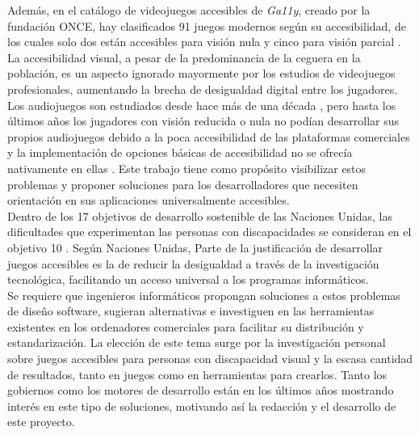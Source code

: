 Además, en el catálogo de videojuegos accesibles de \textit{Ga11y}, creado por la fundación ONCE, hay clasificados 91 juegos modernos según su accesibilidad, de los cuales solo dos están accesibles para visión nula y cinco para visión parcial \cite{Ga11y2022}. La accesibilidad visual, a pesar de la predominancia de la ceguera en la población, es un aspecto ignorado mayormente por los estudios de videojuegos profesionales, aumentando la brecha de desigualdad digital entre los jugadores.\\

Los audiojuegos son estudiados desde hace más de una década \cite{nesteriukAudiogamesAccessibilityInclusion2018a}, pero hasta los últimos años los jugadores con visión reducida o nula no podían desarrollar sus propios audiojuegos debido a la poca accesibilidad de las plataformas comerciales \cite[p.~8]{andradePlayingBlindRevealing2019} y la implementación de opciones básicas de accesibilidad no se ofrecía nativamente en ellas \cite{stana_native_2025, engine_dev_nodate}. Este trabajo tiene como propósito visibilizar estos problemas y proponer soluciones para los desarrolladores que necesiten orientación en sus aplicaciones universalmente accesibles. \\

Dentro de los 17 objetivos de desarrollo sostenible de las Naciones Unidas, las dificultades que experimentan las personas con discapacidades se consideran en el objetivo 10  \cite{martinGoal10Reduce}. Según Naciones Unidas,  Parte de la justificación de desarrollar juegos accesibles es la de reducir la desigualdad a través de la investigación tecnológica, facilitando un acceso universal a los programas informáticos. \\ 

Se requiere que ingenieros informáticos propongan soluciones a estos problemas de diseño software, sugieran alternativas e investiguen en las herramientas existentes en los ordenadores comerciales para facilitar su distribución y estandarización. La elección de este tema surge por la investigación personal sobre juegos accesibles para personas con discapacidad visual y la escasa cantidad de resultados, tanto en juegos como en herramientas para crearlos. Tanto los gobiernos \cite{plan-nacional-accesibilidad-2023} como los motores de desarrollo \cite{engine_dev_nodate} están en los últimos años mostrando interés en este tipo de soluciones, motivando así la redacción y el desarrollo de este proyecto.\\


